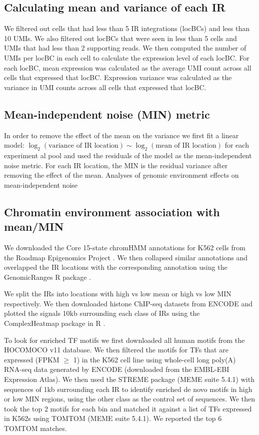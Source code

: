 \subsection*{Calculating mean and variance of each IR}

We filtered out cells that had less than 5 IR integrations (locBCs) and less than 10 UMIs. We also filtered out locBCs that were seen in less than 5 cells and UMIs that had less than 2 supporting reads. We then computed the number of UMIs per locBC in each cell to calculate the expression level of each locBC. For each locBC, mean expression was calculated as the average UMI count across all cells that expressed that locBC. Expression variance was calculated as the variance in UMI counts across all cells that expressed that locBC. 

\subsection*{Mean-independent noise (MIN) metric}

In order to remove the effect of the mean on the variance we first fit a linear model: $\log_2(\text{variance of IR location}) \sim \log_2(\text{mean of IR location})$ for each experiment al pool and used the residuals of the model as the mean-independent noise metric. For each IR location, the MIN is the residual variance after removing the effect of the mean.
Analyses of genomic environment effects on mean-independent noise

\subsection*{Chromatin environment association with mean/MIN}

We downloaded the Core 15-state chromHMM annotations for K562 cells from the Roadmap Epigenomics Project \cite{kundajea_kellism:IntegrativeAnalysis2015}. We then collapsed similar annotations and overlapped the IR locations with the corresponding annotation using the GenomicRanges R package \cite{lawrencem_careyvj:SoftwareComputing2013}. 

We split the IRs into locations with high vs low mean or high vs low MIN respectively. We then downloaded histone ChIP-seq datasets from ENCODE \cite{mooreje_wengz:ExpandedEncyclopaedias2020} and plotted the signals 10kb surrounding each class of IRs using the ComplexHeatmap package in R \cite{guz_schlesnerm:ComplexHeatmaps2016}. 

To look for enriched TF motifs we first downloaded all human motifs from the HOCOMOCO v11 database. We then filtered the motifs for TFs that are expressed (FPKM $\geq$ 1) in the K562 cell line using whole-cell long poly(A) RNA-seq data generated by ENCODE (downloaded from the EMBL-EBI Expression Atlas). We then used the STREME package \cite{baileytl_baileytl:STREMEAccurate2021} (MEME suite 5.4.1) with sequences of 1kb surrounding each IR to identify enriched de novo motifs in high or low MIN regions, using the other class as the control set of sequences. We then took the top 2 motifs for each bin and matched it against a list of TFs expressed in K562s using TOMTOM \cite{guptas_noblews:QuantifyingSimilarity2007} (MEME suite 5.4.1). We reported the top 6 TOMTOM matches. 

